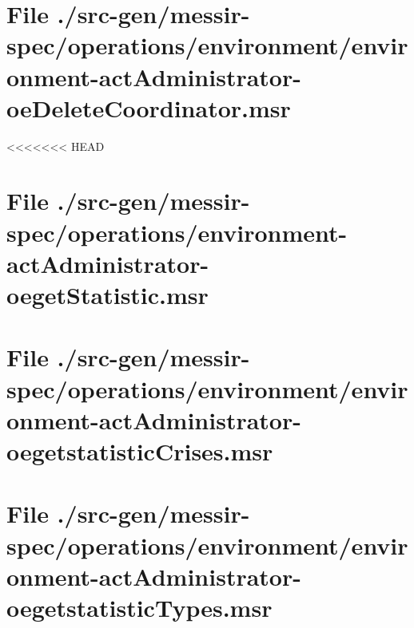 \section[File /src-gen.../environment-actAdministrator-oeDeleteCoordinator.msr]{File ./src-gen/messir-spec/operations/environment/environment-actAdministrator-oeDeleteCoordinator.msr}
\scriptsize

\normalsize
	
<<<<<<< HEAD
\section[File /src-gen/messir-spec.../environment-actAdministrator-oegetStatistic.msr]{File ./src-gen/messir-spec/operations/environment-actAdministrator-oegetStatistic.msr}
\scriptsize

\normalsize
	
\section[File /src-gen.../environment-actAdministrator-oegetstatisticCrises.msr]{File ./src-gen/messir-spec/operations/environment/environment-actAdministrator-oegetstatisticCrises.msr}
\scriptsize

\normalsize
	
\section[File /src-gen.../environment-actAdministrator-oegetstatisticTypes.msr]{File ./src-gen/messir-spec/operations/environment/environment-actAdministrator-oegetstatisticTypes.msr}
\scriptsize

\normalsize
	
